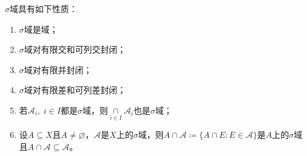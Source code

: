 \begin{property}\label{prop:SigmaField}
	$\sigma$域具有如下性质：
	\begin{enumerate}
		\item $\sigma$域是域；
		\item $\sigma$域对有限交和可列交封闭；
		\item $\sigma$域对有限并封闭；
		\item $\sigma$域对有限差和可列差封闭；
		\item 若$\mathscr{A}_i,\;i\in I$都是$\sigma$域，则$\underset{i\in I}{\overset{}{\cap}}\mathscr{A}_i$也是$\sigma$域；
		\item 设$A\subseteq X$且$A\ne\varnothing$，$\mathscr{A}$是$X$上的$\sigma$域，则$A\cap\mathscr{A}\coloneq\{A\cap E:E\in\mathscr{A}\}$是$A$上的$\sigma$域且$A\cap\mathscr{A}\subseteq\mathscr{A}$。
	\end{enumerate}
\end{property}
